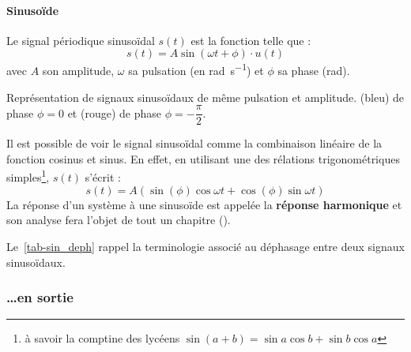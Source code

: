 \paragraph{Sinuso\"ide}
Le signal périodique sinuso\"idal $s(t)$ est la fonction telle que :
\[
    s(t)=A\sin{(\omega t +\phi)}\cdot u(t)
\]
avec $A$ son amplitude, $\omega$ sa pulsation (en \si{\radian\per\second}) 
et $\phi$ sa phase (\si{\radian}).
\begin{marginfigure}[-4em]
    \centering
    \resizebox{\linewidth}{!}{}
    \caption{Représentation de signaux sinuso\"idaux de même pulsation 
             et amplitude. (bleu) de phase $\phi=0$ et 
            (rouge) de phase $\phi=-\dfrac{\pi}{2}$.\label{fig-sin}}
\end{marginfigure}
Il est possible de voir le signal sinuso\"idal comme la combinaison
linéaire de la fonction cosinus et sinus. En effet, en utilisant une 
des rélations trigonométriques simples\footnote{à savoir la comptine des 
lycéens $\sin(a+b)=\sin{a}\cos{b}+\sin{b}\cos{a}$}, $s(t)$ s'écrit :
\[
    s(t)=A(\sin(\phi)\cos{\omega t}+\cos(\phi)\sin{\omega t})
\]
La réponse d'un système à une sinuso\"ide est appelée la 
\textbf{réponse harmonique} et son analyse fera l'objet de tout 
un chapitre ().

Le~\cref{tab-sin_deph} rappel la terminologie associé au déphasage entre 
deux signaux sinuso\"idaux. 
\subsubsection{\ldots en sortie}
